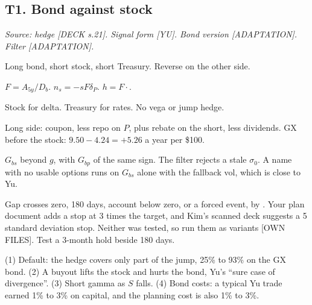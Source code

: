 \documentclass[10pt,a4paper]{article}
\newcommand{\DECK}[1]{\textsf{\footnotesize\textcolor{tagdeck}{[DECK s.#1]}}}
\newcommand{\YU}{\textsf{\footnotesize\textcolor{tagother}{[YU]}}}
\newcommand{\OWN}{\textsf{\footnotesize\textcolor{tagother}{[OWN FILES]}}}
\newcommand{\ADAPT}{\textsf{\footnotesize\textcolor{tagadapt}{[ADAPTATION]}}}
\newcommand{\Gbp}{G_{bp}}
\newcommand{\Gbs}{G_{bs}}
\begin{document}
\subsection*{T1. Bond against stock}
\textit{Source: hedge \DECK{21}. Signal form \YU. Bond version \ADAPT. Filter \ADAPT.}
\begin{description}[style=sameline,leftmargin=1.9cm,labelwidth=1.7cm,labelsep=0.2cm,itemsep=1pt,parsep=0pt,font=\bfseries]
\item[Legs] Long bond, short stock, short Treasury. Reverse on the other side.
\item[Size] $F=A_{5y}/D_b$. $n_s=-sF\delta_P$. $h=F\cdot$.
\item[Hedge] Stock for delta. Treasury for rates. No vega or jump hedge.
\item[Carry] Long side: coupon, less repo on $P$, plus rebate on the short, less dividends. GX before the stock: $9.50-4.24=+5.26$ a year per \$100.
\item[Signal] $\Gbs$ beyond $g$, with $\Gbp$ of the same sign. The filter rejects a stale $\sigma_0$. A name with no usable options runs on $\Gbs$ alone with the fallback vol, which is close to Yu.
\item[Exit] Gap crosses zero, 180 days, account below zero, or a forced event, by . Your plan document adds a stop at 3 times the target, and Kim's scanned deck suggests a 5 standard deviation stop. Neither was tested, so run them as variants \OWN. Test a 3-month hold beside 180 days.
\item[Goes wrong] (1) Default: the hedge covers only part of the jump, 25\% to 93\% on the GX bond. (2) A buyout lifts the stock and hurts the bond, Yu's ``sure case of divergence''. (3) Short gamma as $S$ falls. (4) Bond costs: a typical Yu trade earned 1\% to 3\% on capital, and the planning cost is also 1\% to 3\%.
\end{description}

\end{document}
